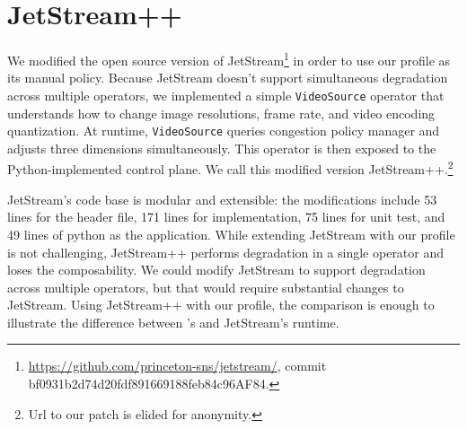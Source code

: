 \documentclass[twocolumn, 9pt]{article}
\begin{document}
%

\section{JetStream++}
\label{appendix:jetstream++}

We modified the open source version of
JetStream\footnote{\url{https://github.com/princeton-sns/jetstream/}, commit
  bf0931b2d74d20fdf891669188feb84c96AF84.} in order to use our profile as its
manual policy. Because JetStream doesn't support simultaneous degradation across
multiple operators, we implemented a simple \texttt{VideoSource} operator that
understands how to change image resolutions, frame rate, and video encoding
quantization. At runtime, \texttt{VideoSource} queries congestion policy manager
and adjusts three dimensions simultaneously. This operator is then exposed to
the Python-implemented control plane. We call this modified version
JetStream++.\footnote{Url to our patch is elided for anonymity.}


JetStream's code base is modular and extensible: the modifications include 53
lines for the header file, 171 lines for implementation, 75 lines for unit test,
and 49 lines of python as the application. While extending JetStream with our
profile is not challenging, JetStream++ performs degradation in a single
operator and loses the composability. We could modify JetStream to support
degradation across multiple operators, but that would require substantial
changes to JetStream. Using JetStream++ with our profile, the comparison is
enough to illustrate the difference between \sysname{}'s and JetStream's
runtime.
\end{document}
